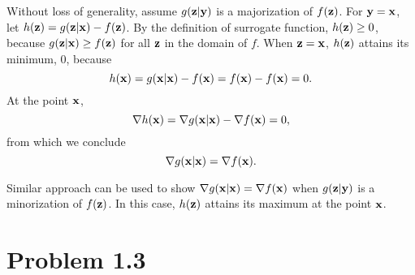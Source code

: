 \documentclass{scrartcl}
\begin{document}
Without loss of generality, assume $g(\mathbf{z}|\mathbf{y})$ is a majorization of
$f(\mathbf{z})$. For $\mathbf{y} = \mathbf{x}$, let
$h(\mathbf{z}) = g(\mathbf{z}|\mathbf{x})-f(\mathbf{z})$. By the definition of surrogate
function, $h(\mathbf{z}) \ge 0$,  because $g(\mathbf{z}|\mathbf{x}) \ge f(\mathbf{z})$
for all $\mathbf{z}$ in the domain of $f$. When $\mathbf{z} = \mathbf{x}$, 
$h(\mathbf{z})$ attains its minimum, 0, because
\begin{equation}
h(\mathbf{x}) = g(\mathbf{x}|\mathbf{x})-f(\mathbf{x}) = f(\mathbf{x})-f(\mathbf{x}) = 0 .
\end{equation}
At the point $\mathbf{x}$,
\begin{equation}
	\nabla h(\mathbf{x}) = \nabla g(\mathbf{x}|\mathbf{x})-\nabla f(\mathbf{x}) = 0 ,
\end{equation}
from which we conclude
\begin{equation}
	\nabla g(\mathbf{x}|\mathbf{x}) = \nabla f(\mathbf{x}) .
\end{equation}

Similar approach can be used to show
$\nabla g(\mathbf{x}|\mathbf{x}) = \nabla f(\mathbf{x})$ when $g(\mathbf{z}|\mathbf{y})$ is
a minorization of $f(\mathbf{z})$. In this case, $h(\mathbf{z})$ attains its
maximum at the point $\mathbf{x}$.


\section*{Problem 1.3}
\end{document}
